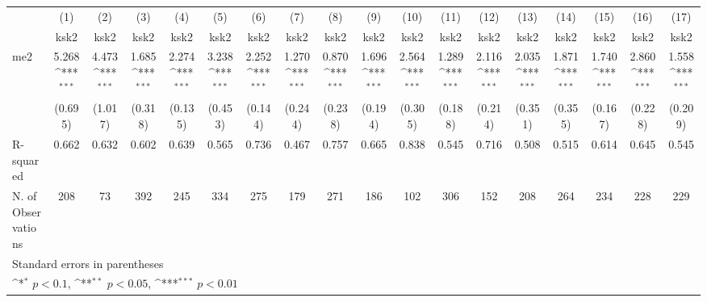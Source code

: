 {
\def\sym#1{\ifmmode^{#1}\else\(^{#1}\)\fi}
\begin{tabular}{l*{17}{c}}
\hline\hline
            &\multicolumn{1}{c}{(1)}&\multicolumn{1}{c}{(2)}&\multicolumn{1}{c}{(3)}&\multicolumn{1}{c}{(4)}&\multicolumn{1}{c}{(5)}&\multicolumn{1}{c}{(6)}&\multicolumn{1}{c}{(7)}&\multicolumn{1}{c}{(8)}&\multicolumn{1}{c}{(9)}&\multicolumn{1}{c}{(10)}&\multicolumn{1}{c}{(11)}&\multicolumn{1}{c}{(12)}&\multicolumn{1}{c}{(13)}&\multicolumn{1}{c}{(14)}&\multicolumn{1}{c}{(15)}&\multicolumn{1}{c}{(16)}&\multicolumn{1}{c}{(17)}\\
            &\multicolumn{1}{c}{ksk2}&\multicolumn{1}{c}{ksk2}&\multicolumn{1}{c}{ksk2}&\multicolumn{1}{c}{ksk2}&\multicolumn{1}{c}{ksk2}&\multicolumn{1}{c}{ksk2}&\multicolumn{1}{c}{ksk2}&\multicolumn{1}{c}{ksk2}&\multicolumn{1}{c}{ksk2}&\multicolumn{1}{c}{ksk2}&\multicolumn{1}{c}{ksk2}&\multicolumn{1}{c}{ksk2}&\multicolumn{1}{c}{ksk2}&\multicolumn{1}{c}{ksk2}&\multicolumn{1}{c}{ksk2}&\multicolumn{1}{c}{ksk2}&\multicolumn{1}{c}{ksk2}\\
\hline
me2         &       5.268\sym{***}&       4.473\sym{***}&       1.685\sym{***}&       2.274\sym{***}&       3.238\sym{***}&       2.252\sym{***}&       1.270\sym{***}&       0.870\sym{***}&       1.696\sym{***}&       2.564\sym{***}&       1.289\sym{***}&       2.116\sym{***}&       2.035\sym{***}&       1.871\sym{***}&       1.740\sym{***}&       2.860\sym{***}&       1.558\sym{***}\\
            &     (0.695)         &     (1.017)         &     (0.318)         &     (0.135)         &     (0.453)         &     (0.144)         &     (0.244)         &     (0.238)         &     (0.194)         &     (0.305)         &     (0.188)         &     (0.214)         &     (0.351)         &     (0.355)         &     (0.167)         &     (0.228)         &     (0.209)         \\
\hline
R-squared   &       0.662         &       0.632         &       0.602         &       0.639         &       0.565         &       0.736         &       0.467         &       0.757         &       0.665         &       0.838         &       0.545         &       0.716         &       0.508         &       0.515         &       0.614         &       0.645         &       0.545         \\
N. of Observations &         208         &          73         &         392         &         245         &         334         &         275         &         179         &         271         &         186         &         102         &         306         &         152         &         208         &         264         &         234         &         228         &         229         \\
\hline\hline
\multicolumn{18}{l}{\footnotesize Standard errors in parentheses}\\
\multicolumn{18}{l}{\footnotesize \sym{*} \(p<0.1\), \sym{**} \(p<0.05\), \sym{***} \(p<0.01\)}\\
\end{tabular}
}
